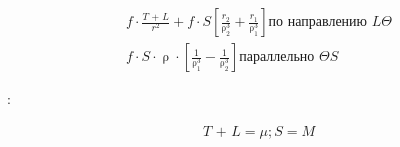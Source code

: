 \documentclass[a4paper,12pt]{article}
\begin{document}
\begin{equation*}
    \begin{aligned}
        f \cdot \frac{\textit{T + L}}{\textit{r}^2} + f \cdot \textit{S} \left[\frac{\textit{r}_2}{\uprho_2^3} + \frac{\textit{r}_1}{\uprho_1^3}\right] \text{по направлению } {\textit{L}}\Theta \\
        f \cdot \textit{S} \cdot \uprho \cdot \left[\frac{1}{\uprho_1^3} - \frac{1}{\uprho_2^3}\right]  \text{параллельно } \Theta{\textit{S}}
    \end{aligned}
\end{equation*}

:

\begin{equation*}
    \begin{aligned}
        \textit{T + L} = \mu; \textit{S} = \textit{M}
    \end{aligned}
\end{equation*}

\listoffigures
\listoftables
\end{document}
